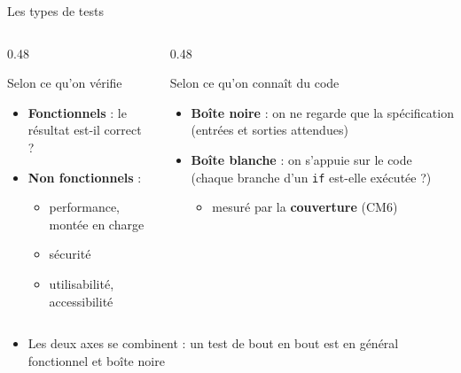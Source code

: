 \documentclass[aspectratio=169,10pt]{beamer}
\begin{document}
\begin{frame}{Les types de tests}
  \begin{columns}[T]
    \begin{column}{0.48\textwidth}
      \begin{block}{Selon ce qu'on vérifie}
        \begin{itemize}
          \item \textbf{Fonctionnels} : le résultat est-il correct ?
          \item \textbf{Non fonctionnels} :
            \begin{itemize}
              \item performance, montée en charge
              \item sécurité
              \item utilisabilité, accessibilité
            \end{itemize}
        \end{itemize}
      \end{block}
    \end{column}
    \begin{column}{0.48\textwidth}
      \begin{block}{Selon ce qu'on connaît du code}
        \begin{itemize}
          \item \textbf{Boîte noire} : on ne regarde que la spécification (entrées et sorties attendues)
          \item \textbf{Boîte blanche} : on s'appuie sur le code (chaque branche d'un \texttt{if} est-elle exécutée ?)
            \begin{itemize}
              \item mesuré par la \textbf{couverture} (CM6)
            \end{itemize}
        \end{itemize}
      \end{block}
    \end{column}
  \end{columns}
  \vspace{3mm}
  \begin{itemize}
    \item Les deux axes se combinent : un test de bout en bout est en général fonctionnel et boîte noire
  \end{itemize}
\end{frame}
\end{document}
